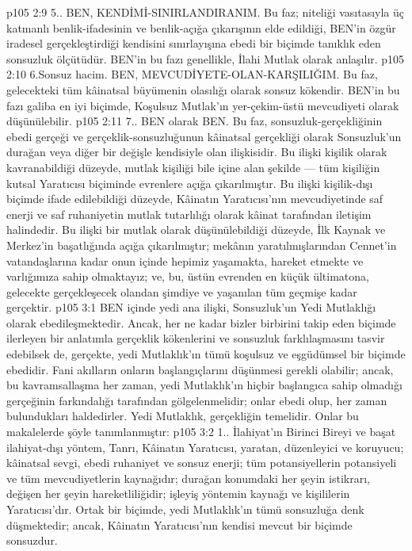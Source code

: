 \vs p105 2:9 5.\bibnobreakspace {}. BEN, KENDİMİ\hyp{}SINIRLANDIRANIM. Bu faz; niteliği vasıtasıyla üç katmanlı benlik\hyp{}ifadesinin ve benlik\hyp{}açığa çıkarışının elde edildiği, BEN’in özgür iradesel gerçekleştirdiği kendisini sınırlayışına ebedi bir biçimde tanıklık eden sonsuzluk ölçütüdür. BEN’in bu fazı genellikle, İlahi Mutlak olarak anlaşılır.
\vs p105 2:10 6.\bibnobreakspace Sonsuz hacim. BEN, MEVCUDİYETE\hyp{}OLAN\hyp{}KARŞILIĞIM. Bu faz, gelecekteki tüm kâinatsal büyümenin olasılığı olarak sonsuz kökendir. BEN’in bu fazı galiba en iyi biçimde, Koşulsuz Mutlak’ın yer\hyp{}çekim\hyp{}üstü mevcudiyeti olarak düşünülebilir.
\vs p105 2:11 7.\bibnobreakspace {}. BEN olarak BEN. Bu faz, sonsuzluk\hyp{}gerçekliğinin ebedi gerçeği ve gerçeklik\hyp{}sonsuzluğunun kâinatsal gerçekliği olarak Sonsuzluk’un durağan veya diğer bir değişle kendisiyle olan ilişkisidir. Bu ilişki kişilik olarak kavranabildiği düzeyde, mutlak kişiliği bile içine alan şekilde --- tüm kişiliğin kutsal Yaratıcısı biçiminde evrenlere açığa çıkarılmıştır. Bu ilişki kişilik\hyp{}dışı biçimde ifade edilebildiği düzeyde, Kâinatın Yaratıcısı’nın mevcudiyetinde saf enerji ve saf ruhaniyetin mutlak tutarlılığı olarak kâinat tarafından iletişim halindedir. Bu ilişki bir mutlak olarak düşünülebildiği düzeyde, İlk Kaynak ve Merkez’in başatlığında açığa çıkarılmıştır; mekânın yaratılmışlarından Cennet’in vatandaşlarına kadar onun içinde hepimiz yaşamakta, hareket etmekte ve varlığımıza sahip olmaktayız; ve, bu, üstün evrenden en küçük ültimatona, gelecekte gerçekleşecek olandan şimdiye ve yaşanılan tüm geçmişe kadar gerçektir.
\vs p105 3:1 BEN içinde yedi ana ilişki, Sonsuzluk’un Yedi Mutlaklığı olarak ebedileşmektedir. Ancak, her ne kadar bizler birbirini takip eden biçimde ilerleyen bir anlatımla gerçeklik kökenlerini ve sonsuzluk farklılaşmasını tasvir edebilsek de, gerçekte, yedi Mutlaklık’ın tümü koşulsuz ve eşgüdümsel bir biçimde ebedidir. Fani akılların onların başlangıçlarını düşünmesi gerekli olabilir; ancak, bu kavramsallaşma her zaman, yedi Mutlaklık’ın hiçbir başlangıca sahip olmadığı gerçeğinin farkındalığı tarafından gölgelenmelidir; onlar ebedi olup, her zaman bulundukları haldedirler. Yedi Mutlaklık, gerçekliğin temelidir. Onlar bu makalelerde şöyle tanımlanmıştır:
\vs p105 3:2 1.. İlahiyat’ın Birinci Bireyi ve başat ilahiyat\hyp{}dışı yöntem, Tanrı, Kâinatın Yaratıcısı, yaratan, düzenleyici ve koruyucu; kâinatsal sevgi, ebedi ruhaniyet ve sonsuz enerji; tüm potansiyellerin potansiyeli ve tüm mevcudiyetlerin kaynağıdır; durağan konumdaki her şeyin istikrarı, değişen her şeyin hareketliliğidir; işleyiş yöntemin kaynağı ve kişililerin Yaratıcısı’dır. Ortak bir biçimde, yedi Mutlaklık’ın tümü sonsuzluğa denk düşmektedir; ancak, Kâinatın Yaratıcısı’nın kendisi mevcut bir biçimde sonsuzdur.
